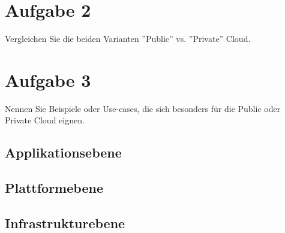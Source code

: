 \documentclass[11pt,titlepage]{article}
\newenvironment{shadedquotation}
 {\begin{shaded*}
  \quoting[leftmargin=0pt, vskip=0pt]
 }
 {\endquoting
 \end{shaded*}
}
\begin{document}
\par\medskip

\section{Aufgabe 2}
\label{sec:Aufgabe-2}

\begin{shadedquotation}
  Vergleichen Sie die beiden Varianten ''Public'' vs. ''Private'' Cloud.
\end{shadedquotation}

\par\medskip

\section{Aufgabe 3}
\label{sec:Aufgabe-3}

\begin{shadedquotation}
  Nennen Sie Beispiele oder Use-cases, die sich besonders für die Public oder Private Cloud eignen.
\end{shadedquotation}

\subsection{Applikationsebene}
\label{subsec:Aufgabe-3_Applikationsebene}

\subsection{Plattformebene}
\label{subsec:Aufgabe-3_Plattformebene}

\subsection{Infrastrukturebene}
\label{subsec:Aufgabe-3_Infrastrukturebene}
\end{document}
